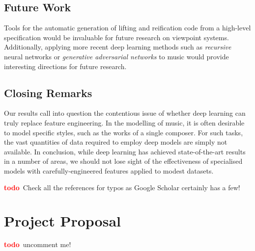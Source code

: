 \documentclass[12pt,a4paper,twoside,openright]{report}
\newcommand{\todo}{\textcolor{red}{\textbf{todo}~}}
\begin{document}
\section{Future Work}

Tools for the automatic generation of lifting and reification code from a
high-level specification would be invaluable for future research on viewpoint
systems. Additionally, applying more recent deep learning methods such as
\emph{recursive} neural networks or \emph{generative adversarial networks} to
music would provide interesting directions for future research.

\section{Closing Remarks}

Our results call into question the contentious issue of whether deep learning
can truly replace feature engineering. In the modelling of music, it is often
desirable to model specific styles, such as the works of a single composer. For
such tasks, the vast quantities of data required to employ deep models are
simply not available. In conclusion, while deep learning has achieved
state-of-the-art results in a number of areas, we should not lose sight of the
effectiveness of specialised models with carefully-engineered features applied
to modest datasets.

\printbibliography
{}
\todo Check all the references for typos as Google Scholar certainly has a few!

\appendix

\chapter{Project Proposal}

\todo uncomment me!
%
\end{document}
